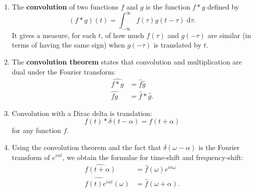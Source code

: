 \documentclass{article}
\newcommand{\diff}{\;\mathrm{d}}
\begin{document}
\begin{enumerate}
	\item The \textbf{convolution} of two functions $f$ and $g$ is the function $f\ast g$ defined by
		\[(f\ast g)(t)=\int_{-\infty}^\infty f(\tau)g(t-\tau)\diff \tau.\]
		It gives a measure, for each $t$, of how much $f(\tau)$ and $g(-\tau)$ are similar (in terms of having the same sign) when $g(-\tau)$ is translated by $t$.
	\item The \textbf{convolution theorem} states that convolution and multiplication are dual under the Fourier transform:
		\begin{align*}
			\widehat{f\ast g}&=\hat{f}\hat{g}\\
			\widehat{fg}&=\hat{f}\ast\hat{g}.
		\end{align*}
	\item Convolution with a Dirac delta is translation:
		\[f(t)\ast \delta(t-\alpha) = f(t+\alpha)\]
		for any function $f$.
	\item Using the convolution theorem and the fact that $\delta(\omega-\alpha)$ is the Fourier transform of $e^{i\alpha t}$, we obtain the formulae for time-shift and frequency-shift:
		\begin{align*}
			\widehat{f(t+\alpha)}&= \hat{f}(\omega)e^{i\alpha \omega}\\
			\widehat{f(t)e^{i\alpha t}}(\omega)&=\hat{f}(\omega+\alpha).
		\end{align*}
\end{enumerate}
\end{document}
